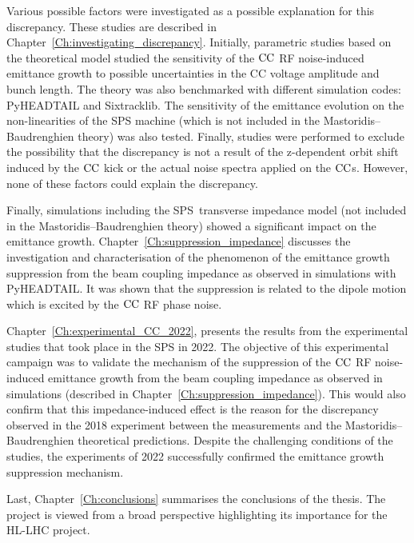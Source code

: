 Various possible factors were investigated as a possible explanation for this discrepancy. These studies are described in Chapter~\ref{Ch:investigating_discrepancy}. Initially, parametric studies based on the theoretical model studied the sensitivity of the ${\mathrm{CC}}$ RF noise-induced emittance growth to possible uncertainties in the CC voltage amplitude and bunch length. The theory was also benchmarked with different simulation codes: PyHEADTAIL and Sixtracklib. The sensitivity of the emittance evolution on the non-linearities of the SPS machine (which is not included in the Mastoridis--Baudrenghien theory) was also tested. Finally, studies were performed to exclude the possibility that the discrepancy is not a result of the z-dependent orbit shift induced by the ${\mathrm{CC}}$ kick or the actual noise spectra applied on the ${\mathrm{CC}}$s. However, none of these factors could explain the discrepancy.

Finally, simulations including the SPS transverse impedance model (not included in the Mastoridis--Baudrenghien theory) showed a significant impact on the emittance growth. Chapter~\ref{Ch:suppression_impedance} discusses the investigation and characterisation of the phenomenon of the emittance growth suppression from the beam coupling impedance as observed in simulations with PyHEADTAIL. It was shown that the suppression is related to the dipole motion which is excited by the ${\mathrm{CC}}$ RF phase noise.

Chapter~\ref{Ch:experimental_CC_2022}, presents the results from the experimental studies that took place in the SPS in 2022. The objective of this experimental campaign was to validate the mechanism of the suppression of the ${\mathrm{CC}}$ RF noise-induced emittance growth from the beam coupling impedance as observed in simulations (described in Chapter~\ref{Ch:suppression_impedance}). This would also confirm that this impedance-induced effect is the reason for the discrepancy observed in the 2018 experiment between the measurements and the Mastoridis--Baudrenghien theoretical predictions. Despite the challenging conditions of the studies, the experiments of 2022 successfully confirmed the emittance growth suppression mechanism.%


Last, Chapter~\ref{Ch:conclusions} summarises the conclusions of the thesis. The project is viewed from a broad perspective highlighting its importance for the HL-LHC project. %